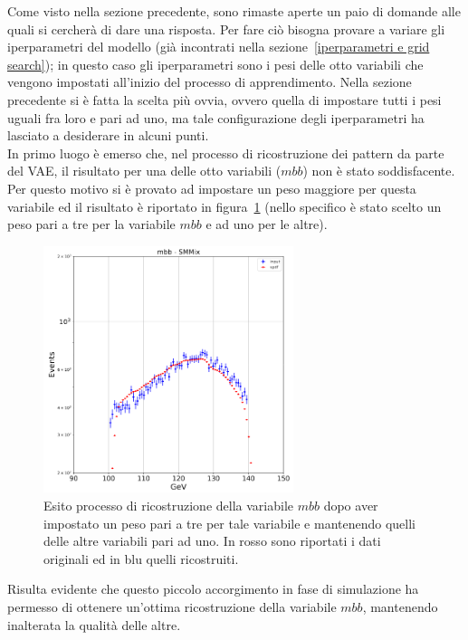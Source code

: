 Come visto nella sezione precedente, sono rimaste aperte un paio di domande alle quali si cercherà di dare una risposta. Per fare ciò bisogna provare a variare gli iperparametri del modello (già incontrati nella sezione~\ref{iperparametri e grid search}); in questo caso gli iperparametri sono i pesi delle otto variabili che vengono impostati all'inizio del processo di apprendimento. Nella sezione precedente si è fatta la scelta più ovvia, ovvero quella di impostare tutti i pesi uguali fra loro e pari ad uno, ma tale configurazione degli iperparametri ha lasciato a desiderare in alcuni punti. \\
In primo luogo è emerso che, nel processo di ricostruzione dei pattern da parte del VAE, il risultato per una delle otto variabili ($\textit{mbb}$) non è stato soddisfacente. Per questo motivo si è provato ad impostare un peso maggiore per questa variabile ed il risultato è riportato in figura~\ref{mbb_ottimizzazione} (nello specifico è stato scelto un peso pari a tre per la variabile $\textit{mbb}$ e ad uno per le altre).

\begin{figure}[h!]
	\centering
	\includegraphics[width=0.65\textwidth]{figs/risultati_simulazione/verifica_mbb.png}
	\caption{Esito processo di ricostruzione della variabile $\textit{mbb}$ dopo aver impostato un peso pari a tre per tale variabile e mantenendo quelli delle altre variabili pari ad uno. In rosso sono riportati i dati originali ed in blu quelli ricostruiti.}
	\label{mbb_ottimizzazione}
\end{figure}

Risulta evidente che questo piccolo accorgimento in fase di simulazione ha permesso di ottenere un'ottima ricostruzione della variabile $\textit{mbb}$, mantenendo inalterata la qualità delle altre. 

